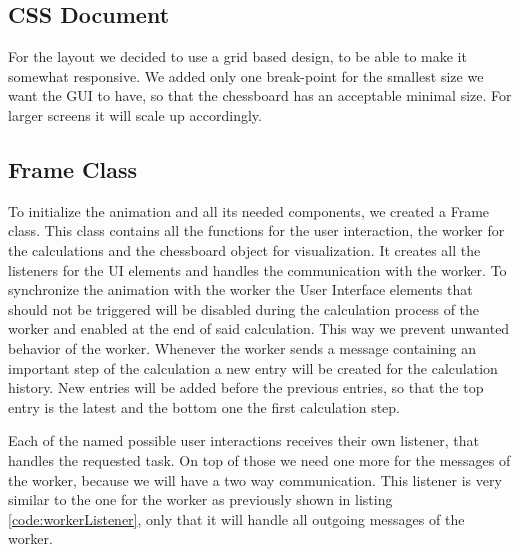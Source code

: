 \subsection{CSS Document}
\label{sub:impCSS}
For the layout we decided to use a grid based design, to be able to make it somewhat responsive. We added only one break-point for the smallest size we want the GUI to have, so that the chessboard has an acceptable minimal size. For larger screens it will scale up accordingly.

\subsection{Frame Class}
\label{sub:impFrame}
To initialize the animation and all its needed components, we created a Frame class. This class contains all the functions for the user interaction, the worker for the calculations and the chessboard object for visualization. It creates all the listeners for the UI elements and handles the communication with the worker. To synchronize the animation with the worker the User Interface elements that should not be triggered will be disabled during the calculation process of the worker and enabled at the end of said calculation. This way we prevent unwanted behavior of the worker. Whenever the worker sends a message containing an important step of the calculation a new entry will be created for the calculation history. New entries will be added before the previous entries, so that the top entry is the latest and the bottom one the first calculation step.

Each of the named possible user interactions receives their own listener, that handles the requested task. On top of those we need one more for the messages of the worker, because we will have a two way communication. This listener is very similar to the one for the worker as previously shown in listing \ref{code:workerListener}, only that it will handle all outgoing messages of the worker.